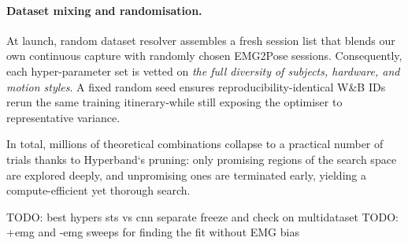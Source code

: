 \paragraph{Dataset mixing and randomisation.}
At launch, random dataset resolver assembles a fresh session list that blends our own
continuous capture with randomly chosen EMG2Pose sessions.
Consequently, each hyper-parameter set is vetted on \emph{the full diversity of
subjects, hardware, and motion styles}.
A fixed random seed ensures reproducibility-identical W\&B IDs rerun the same
training itinerary-while still exposing the optimiser to representative
variance.

In total, millions of theoretical combinations collapse to a practical number
of trials thanks to Hyperband`s pruning: only promising regions of the search
space are explored deeply, and unpromising ones are terminated early, yielding
a compute-efficient yet thorough search.

TODO: best hypers sts vs cnn separate freeze and check on multidataset
TODO: +emg and -emg sweeps for finding the fit without EMG bias